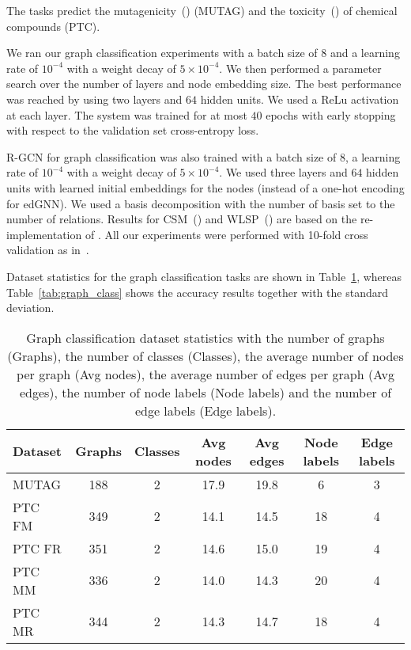 \documentclass{article} \usepackage{iclr2019_conference,times}
\begin{document}
The tasks  predict the mutagenicity~(\cite{Debnath1991,Kriege2012}) (MUTAG) and the toxicity~(\cite{Helma2001}) of chemical compounds (PTC).

We ran our graph classification experiments with a batch size of $8$ and a learning rate of $10^{-4}$ with a weight decay of $5 \times 10^{-4}$. We then performed a parameter search over the number of layers and node embedding size. The best performance was reached by using two layers and $64$ hidden units. We used a ReLu activation at each layer. The system was trained for at most $40$ epochs with early stopping with respect to the validation set cross-entropy loss. 

R-GCN for graph classification was also trained with a batch size of $8$, a learning rate of $10^{-4}$ with a weight decay of $5 \times 10^{-4}$. We used three layers and $64$ hidden units with learned initial embeddings for the nodes (instead of a one-hot encoding for edGNN).
We used a basis decomposition with the number of basis set to the number of relations. Results for CSM~(\cite{Kriege2012}) and WLSP~(\cite{Shervashidze2011}) are based on the re-implementation of \cite{Kriege2012}. All our experiments were performed with 10-fold cross validation as in~\cite{Kriege2012}. 

Dataset statistics for the graph classification tasks are shown in Table~\ref{tab:graph_class_stat}, whereas Table~\ref{tab:graph_class} shows the accuracy results together with the standard deviation. 

\begin{table}[h]
  \caption{Graph classification dataset statistics with the number of graphs (Graphs), the number of classes (Classes), the average number of nodes per graph (Avg nodes), the average number of edges per graph (Avg edges), the number of node labels (Node labels) and the number of edge labels (Edge labels).}
  \label{tab:graph_class_stat}
  \centering
  \begin{tabular}{lcccccc}
  \toprule
    Dataset & Graphs & Classes & Avg nodes & Avg edges & Node labels & Edge labels   \\
    \midrule
    MUTAG  &   188  & 2 & 17.9 & 19.8  & 6 & 3   \\
    PTC FM &   349  & 2 & 14.1 & 14.5 & 18 & 4  \\
    PTC FR &   351  & 2 & 14.6 & 15.0 & 19 & 4  \\
    PTC MM &   336  & 2 & 14.0 & 14.3 & 20 & 4  \\
    PTC MR &   344  & 2 & 14.3 & 14.7 & 18 & 4  \\
    \bottomrule
  \end{tabular}
\end{table}
\end{document}
